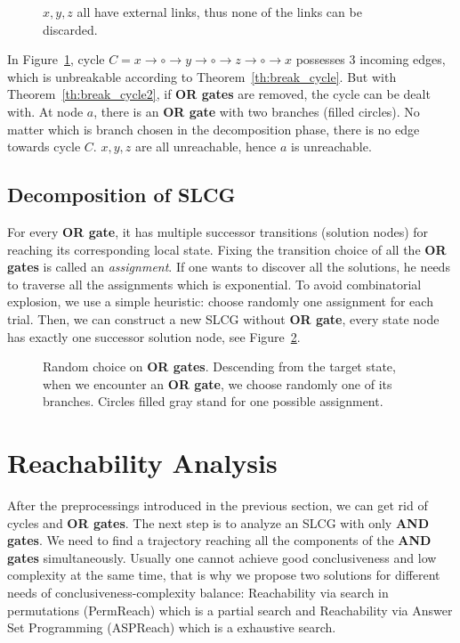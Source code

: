     \begin{figure}[ht]
        \centering
        
        \caption[Removal of cycles]{$x,y,z$ all have external links, thus none of the links can be discarded.}
        \label{cycle3}
    \end{figure}

\begin{example}\label{example:cycles}
    In Figure~\ref{cycle3}, cycle $C=x\to \circ \to y \to \circ \to z\to \circ \to x$ possesses 3 incoming edges, which is unbreakable according to Theorem~\ref{th:break_cycle}.
    But with Theorem~\ref{th:break_cycle2}, if \textbf{OR gates} are removed, the cycle can be dealt with.
    At node $a$, there is an \textbf{OR gate} with two branches (filled circles).
    No matter which is branch chosen in the decomposition phase, there is no edge towards cycle $C$.
    $x,y,z$ are all unreachable, hence $a$ is unreachable.
\end{example}

\subsection{Decomposition of SLCG}\label{sec:decomp}

For every \textbf{OR gate}, it has multiple successor transitions (solution nodes) for reaching its corresponding local state.
Fixing the transition choice of all the \textbf{OR gates} is called an \textit{assignment}.
If one wants to discover all the solutions, he needs to traverse all the assignments which is exponential.
To avoid combinatorial explosion, we use a simple heuristic: 
choose randomly one assignment for each trial.
Then, we can construct a new SLCG without \textbf{OR gate}, every state node has exactly one successor solution node, see Figure~\ref{fig:heuristics}.

\begin{figure}[ht]
    \centering
    
    \caption[Random choice on \textbf{OR gates}]{Random choice on \textbf{OR gates}. Descending from the target state, when we encounter an \textbf{OR gate}, we choose randomly one of its branches. Circles filled gray stand for one possible assignment.}
    \label{fig:heuristics}
\end{figure}

\section{Reachability Analysis}
After the preprocessings introduced in the previous section, we can get rid of cycles and \textbf{OR gates}.
The next step is to analyze an SLCG with only \textbf{AND gates}.
We need to find a trajectory reaching all the components of the \textbf{AND gates} simultaneously.
Usually one cannot achieve good conclusiveness and low complexity at the same time, that is why we propose two solutions for different needs of conclusiveness-complexity balance: Reachability via search in permutations (PermReach) which is a partial search and Reachability via Answer Set Programming (ASPReach) which is a exhaustive search.

